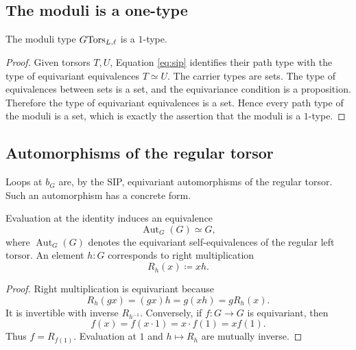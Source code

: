 \subsection{The moduli is a one-type}
\begin{proposition}
The moduli type $G\mathrm{Tors}_{L,\ell}$ is a $1$-type.
\end{proposition}
\begin{proof}
Given torsors $T,U$, Equation \eqref{eq:sip} identifies their path type with the type of equivariant equivalences $T\simeq U$. The carrier types are sets. The type of equivalences between sets is a set, and the equivariance condition is a proposition. Therefore the type of equivariant equivalences is a set. Hence every path type of the moduli is a set, which is exactly the assertion that the moduli is a $1$-type.
\end{proof}


\subsection{Automorphisms of the regular torsor}
Loops at $b_G$ are, by the SIP, equivariant automorphisms of the regular torsor. Such an automorphism has a concrete form.

\begin{proposition}
Evaluation at the identity induces an equivalence
\begin{equation}
\operatorname{Aut}_G(G)\simeq G,
\end{equation}
where $\operatorname{Aut}_G(G)$ denotes the equivariant self-equivalences of the regular left torsor. An element $h:G$ corresponds to right multiplication
\begin{equation}
R_h(x)\coloneqq xh.
\label{eq:right-translation}
\end{equation}
\end{proposition}
\begin{proof}
Right multiplication is equivariant because
\begin{equation}
R_h(gx)=(gx)h=g(xh)=gR_h(x).
\end{equation}
It is invertible with inverse $R_{h^{-1}}$. Conversely, if $f:G\to G$ is equivariant, then
\begin{equation}
f(x)=f(x\cdot 1)=x\cdot f(1)=xf(1).
\end{equation}
Thus $f=R_{f(1)}$. Evaluation at $1$ and $h\mapsto R_h$ are mutually inverse.
\end{proof}

